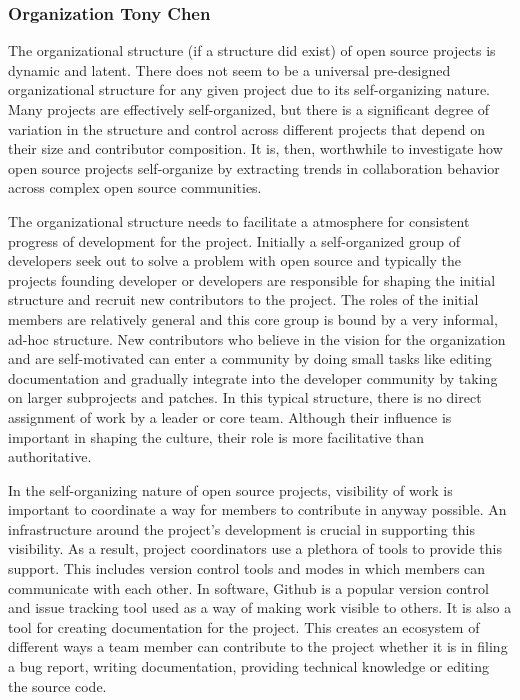 \subsubsection{Organization Tony Chen}

The organizational structure (if a structure did exist) of open source projects is dynamic and latent. There does not seem to be a universal pre-designed organizational structure for any given project due to its self-organizing nature. Many projects are effectively self-organized, but there is a significant degree of variation in the structure and control across different projects that depend on their size and contributor composition. It is, then, worthwhile to investigate how open source projects self-organize by extracting trends in collaboration behavior across complex open source communities.

The organizational structure needs to facilitate a atmosphere for consistent progress of development for the project. Initially a self-organized group of developers seek out to solve a problem with open source and typically the projects founding developer or developers are responsible for shaping the initial structure and recruit new contributors to the project. The roles of the initial members are relatively general and this core group is bound by a very informal, ad-hoc structure. New contributors who believe in the vision for the organization and are self-motivated can enter a community by doing small tasks like editing documentation and gradually integrate into the developer community by taking on larger subprojects and patches. In this typical structure, there is no direct assignment of work by a leader or core team. Although their influence is important in shaping the culture, their role is more facilitative than authoritative.

In the self-organizing nature of open source projects, visibility of work is important to coordinate a way for members to contribute in anyway possible. An infrastructure around the project's development is crucial in supporting this visibility. As a result, project coordinators use a plethora of tools to provide this support. This includes version control tools and modes in which members can communicate with each other. In software, Github is a popular version control and issue tracking tool used as a way of making work visible to others. It is also a tool for creating documentation for the project. This creates an ecosystem of different ways a team member can contribute to the project whether it is in filing a bug report, writing documentation, providing technical knowledge or editing the source code.
